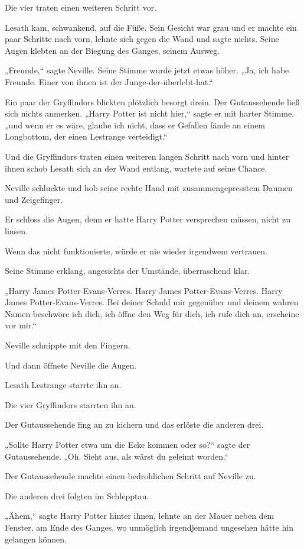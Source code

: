 {Die vier traten einen weiteren Schritt vor.

Lesath kam, schwankend, auf die Füße. Sein Gesicht war grau und er machte ein paar Schritte nach vorn, lehnte sich gegen die Wand und sagte nichts. Seine Augen klebten an der Biegung des Ganges, seinem Ausweg.

„Freunde,“ sagte Neville. Seine Stimme wurde jetzt etwas höher. „Ja, ich habe Freunde. Einer von ihnen ist der Junge-der-überlebt-hat.“

Ein paar der Gryffindors blickten plötzlich besorgt drein. Der Gutaussehende ließ sich nichts anmerken. „Harry Potter ist nicht hier,“ sagte er mit harter Stimme. „und wenn er es wäre, glaube ich nicht, dass er Gefallen fände an einem Longbottom, der einen Lestrange verteidigt.“

Und die Gryffindors traten einen weiteren langen Schritt nach vorn und hinter ihnen schob Lesath sich an der Wand entlang, wartete auf seine Chance.

Neville schluckte und hob seine rechte Hand mit zusammengepresstem Daumen und Zeigefinger.

Er schloss die Augen, denn er hatte Harry Potter versprechen müssen, nicht zu linsen.

Wenn das nicht funktionierte, würde er nie wieder irgendwem vertrauen.

Seine Stimme erklang, angesichts der Umstände, überraschend klar.

„Harry James Potter-Evans-Verres. Harry James Potter-Evans-Verres. Harry James Potter-Evans-Verres. Bei deiner Schuld mir gegenüber und deinem wahren Namen beschwöre ich dich, ich öffne den Weg für dich, ich rufe dich an, erscheine vor mir.“

Neville schnippte mit den Fingern.

Und dann öffnete Neville die Augen.

Lesath Lestrange starrte ihn an.

Die vier Gryffindors starrten ihn an.

Der Gutaussehende fing an zu kichern und das erlöste die anderen drei.

„Sollte Harry Potter etwa um die Ecke kommen oder so?“ sagte der Gutaussehende. „Oh. Sieht aus, als wärst du geleimt worden.“

Der Gutaussehende machte einen bedrohlichen Schritt auf Neville zu.

Die anderen drei folgten im Schlepptau.

„Ähem,“ sagte Harry Potter hinter ihnen, lehnte an der Mauer neben dem Fenster, am Ende des Ganges, wo unmöglich irgendjemand ungesehen hätte hin gelangen können.

}
